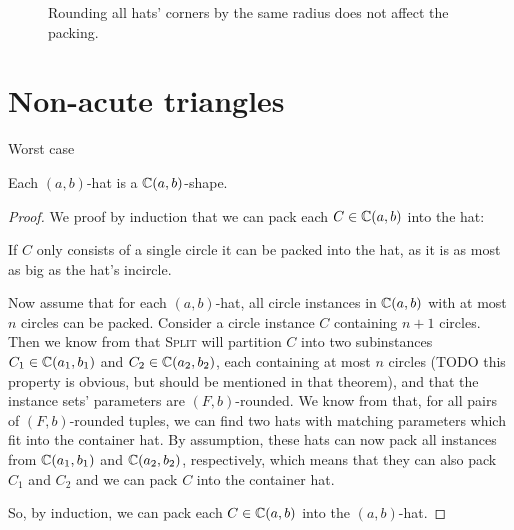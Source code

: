 \documentclass[a4paper,style=print,bibliography=totoc,nexus,lnum,extramargin]{tubsbook}
\begin{document}
\begin{figure}

    \caption{Rounding all hats' corners by the same radius does not affect the packing.}
    \label{fig:rounding-hats}
\end{figure}

\section{Non-acute triangles}

Worst case

\begin{theorem}\label{th:hats}
    Each $(a,b)$-hat is a $\mathbb{C}(a,b)$-shape.
\end{theorem}

\begin{proof}

    We proof by induction that we can pack each $C \in \mathbb{C}(a,b)$ into the hat:

    If $C$ only consists of a single circle it can be packed into the hat, as it is as most as big as the hat's incircle.

    Now assume that for each $(a,b)$-hat, all circle instances in $\mathbb{C}(a,b)$ with at most $n$ circles can be packed. Consider a circle instance $C$ containing $n+1$ circles. Then we know from  that \textsc{Split} will partition $C$ into two subinstances $C_1 \in \mathbb{C}(a_1, b_1)$ and $C_2 \in \mathbb{C}(a_2, b_2)$, each containing at most $n$ circles (TODO this property is obvious, but should be mentioned in that theorem), and that the instance sets' parameters are $(F,b)$-rounded. We know from  that, for all pairs of $(F,b)$-rounded tuples, we can find two hats with matching parameters which fit into the container hat. By assumption, these hats can now pack all instances from $\mathbb{C}(a_1, b_1)$ and $\mathbb{C}(a_2, b_2)$, respectively, which means that they can also pack $C_1$ and $C_2$ and we can pack $C$ into the container hat.

    So, by induction, we can pack each $C \in \mathbb{C}(a,b)$ into the $(a,b)$-hat.
\end{proof}
\end{document}
